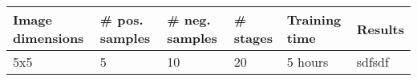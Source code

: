 \begin{tabularx}
{\textwidth}{llllll}
    \toprule
    \textbf{Image dimensions} & \textbf{\# pos. samples} & \textbf{\# neg. samples} & \textbf{\# stages} & \textbf{Training time} & \textbf{Results} \\
    \midrule
    5x5 & 5 & 10 & 20 & 5 hours & sdfsdf \\
    \bottomrule
\end{tabularx}
